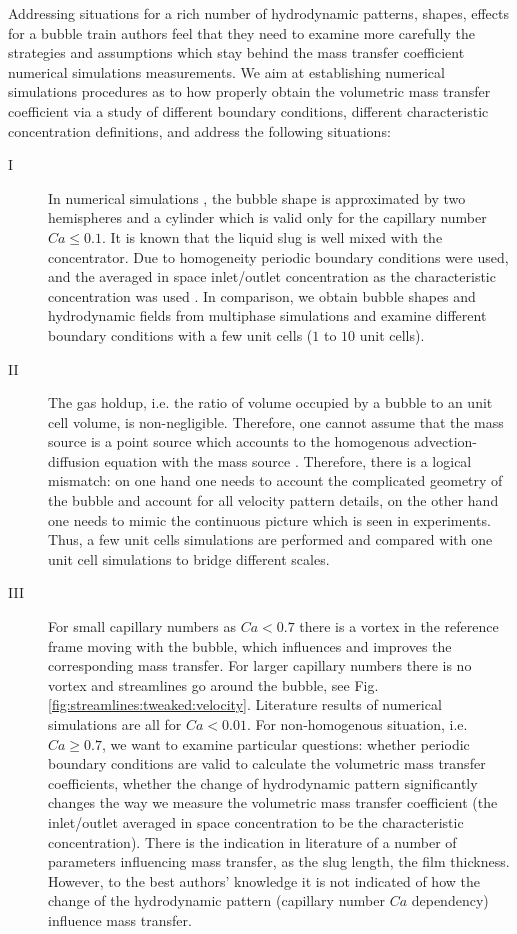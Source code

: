 \documentclass{article}
\begin{document}
Addressing situations for a rich number of hydrodynamic patterns, shapes, effects for a bubble
train authors feel that they need to examine more carefully the strategies and assumptions which
stay behind the mass transfer coefficient numerical simulations measurements. We aim at establishing
numerical simulations procedures as to how properly obtain the volumetric
mass transfer coefficient via a study of different boundary conditions, different characteristic concentration definitions, and address the following situations:
\begin{description}
\item[I] In numerical simulations \cite{vanbaten-circular,kreutzer-overview}, the bubble shape is approximated by two hemispheres and a cylinder which is valid only for the capillary number $Ca\leq 0.1$. It is known \cite{kreutzer-overview} that the liquid slug is well mixed with the concentrator. Due to homogeneity periodic boundary conditions were used, and the averaged in space inlet/outlet concentration as the characteristic concentration was used \cite{vanbaten-circular}. In comparison, we obtain bubble shapes and hydrodynamic fields from multiphase simulations \cite{kuzmin-binary2d,kuzmin-binary3d} and examine different boundary conditions with a few unit cells ($1$ to $10$ unit cells). 
\item[II] The gas holdup, i.e. the ratio of volume occupied by a bubble to an unit cell volume, is
non-negligible. Therefore, one cannot assume that the mass source is a point source which accounts
to the homogenous advection-diffusion equation with the mass source \cite{jos-mass}.  Therefore, there is a logical
mismatch: on one hand one needs to account the complicated geometry of the bubble and account for
all velocity pattern details, on the other hand one needs to mimic the continuous picture which is
seen in experiments. Thus, a few unit cells simulations are performed and compared with one unit cell simulations to bridge different scales.
\item[III] For small capillary numbers as $Ca<0.7$ \cite{giavedoni-numerical} there is a vortex in
the reference frame moving with
the bubble, which  influences and improves the corresponding mass transfer.  For larger capillary
numbers there is no vortex and streamlines go around the bubble, see Fig.
\ref{fig:streamlines:tweaked:velocity}. Literature results of numerical simulations \cite{kreutzer-overview,vanbaten-circular} are all for $Ca<0.01$.  For non-homogenous situation, i.e. $Ca\geq 0.7$, we want to examine particular questions: whether periodic boundary conditions are valid to calculate the volumetric mass transfer coefficients, whether the change of hydrodynamic pattern significantly changes the way we measure the volumetric mass transfer coefficient (the inlet/outlet averaged in space concentration to be the characteristic concentration).  There is the indication in literature \cite{bercic-mass,yue-mass} of a number of parameters influencing mass transfer, as the slug length, the film thickness. However, to the best authors' knowledge it is not indicated of how the change of the hydrodynamic pattern (capillary number $Ca$ dependency) influence mass transfer. 
\end{description}
\end{document}
